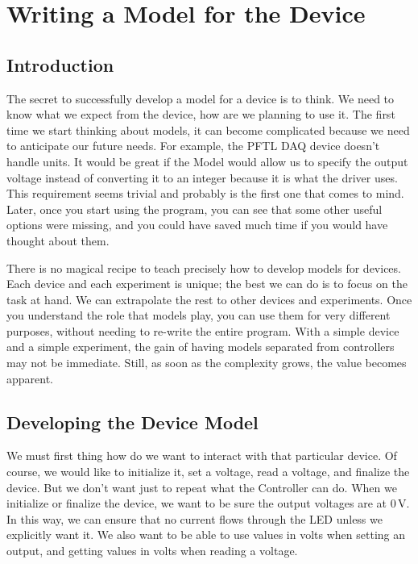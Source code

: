 \chapter{Writing a Model for the Device}\label{ch:device-model}

\section{Introduction}\label{sec:device-model-introduction}
The secret to successfully develop a model for a device is to think. We need to know what we expect from the device, how are we planning to use it. The first time we start thinking about models, it can become complicated because we need to anticipate our future needs. For example, the {PFTL DAQ} device doesn't handle units. It would be great if the Model would allow us to specify the output voltage instead of converting it to an integer because it is what the driver uses. This requirement seems trivial and probably is the first one that comes to mind. Later, once you start using the program, you can see that some other useful options were missing, and you could have saved much time if you would have thought about them.

There is no magical recipe to teach precisely how to develop models for devices. Each device and each experiment is unique; the best we can do is to focus on the task at hand. We can extrapolate the rest to other devices and experiments. Once you understand the role that models play, you can use them for very different purposes, without needing to re-write the entire program. With a simple device and a simple experiment, the gain of having models separated from controllers may not be immediate. Still, as soon as the complexity grows, the value becomes apparent.


\section{Developing the Device Model}\label{sec:device-model}
We must first thing how do we want to interact with that particular device. Of course, we would like to initialize it, set a voltage, read a voltage, and finalize the device. But we don't want just to repeat what the Controller can do. When we initialize or finalize the device, we want to be sure the output voltages are at $0\,\textrm{V}$. In this way, we can ensure that no current flows through the LED unless we explicitly want it. We also want to be able to use values in volts when setting an output, and getting values in volts when reading a voltage.

